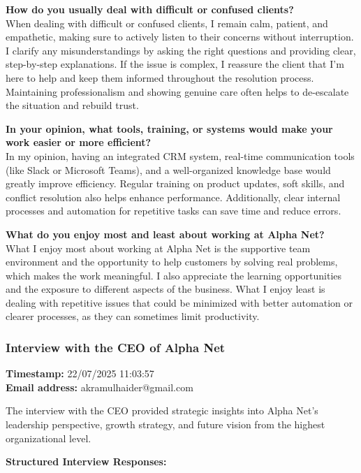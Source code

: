 \textbf{How do you usually deal with difficult or confused clients?}\\
When dealing with difficult or confused clients, I remain calm, patient, and empathetic, making sure to actively listen to their concerns without interruption. I clarify any misunderstandings by asking the right questions and providing clear, step-by-step explanations. If the issue is complex, I reassure the client that I'm here to help and keep them informed throughout the resolution process. Maintaining professionalism and showing genuine care often helps to de-escalate the situation and rebuild trust.

\textbf{In your opinion, what tools, training, or systems would make your work easier or more efficient?}\\
In my opinion, having an integrated CRM system, real-time communication tools (like Slack or Microsoft Teams), and a well-organized knowledge base would greatly improve efficiency. Regular training on product updates, soft skills, and conflict resolution also helps enhance performance. Additionally, clear internal processes and automation for repetitive tasks can save time and reduce errors.

\textbf{What do you enjoy most and least about working at Alpha Net?}\\
What I enjoy most about working at Alpha Net is the supportive team environment and the opportunity to help customers by solving real problems, which makes the work meaningful. I also appreciate the learning opportunities and the exposure to different aspects of the business. What I enjoy least is dealing with repetitive issues that could be minimized with better automation or clearer processes, as they can sometimes limit productivity.

\subsubsection*{Interview with the CEO of Alpha Net}
\textbf{Timestamp:} 22/07/2025 11:03:57\\
\textbf{Email address:} akramulhaider@gmail.com

The interview with the CEO provided strategic insights into Alpha Net's leadership perspective, growth strategy, and future vision from the highest organizational level.

\textbf{Structured Interview Responses:}

